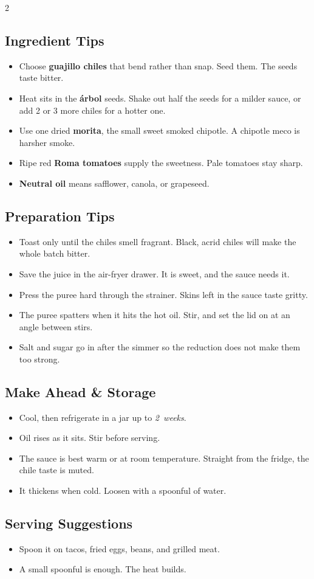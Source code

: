 \documentclass[11pt,letterpaper]{article}
\begin{document}
{\begin{multicols}{2}
\subsection*{Ingredient Tips}
\begin{itemize}
    \item Choose \textbf{guajillo chiles} that bend rather than snap. Seed them. The seeds taste bitter.
    \item Heat sits in the \textbf{árbol} seeds. Shake out half the seeds for a milder sauce, or add 2 or 3 more chiles for a hotter one.
    \item Use one dried \textbf{morita}, the small sweet smoked chipotle. A chipotle meco is harsher smoke.
    \item Ripe red \textbf{Roma tomatoes} supply the sweetness. Pale tomatoes stay sharp.
    \item \textbf{Neutral oil} means safflower, canola, or grapeseed.
\end{itemize}

\subsection*{Preparation Tips}
\begin{itemize}
    \item Toast only until the chiles smell fragrant. Black, acrid chiles will make the whole batch bitter.
    \item Save the juice in the air-fryer drawer. It is sweet, and the sauce needs it.
    \item Press the puree hard through the strainer. Skins left in the sauce taste gritty.
    \item The puree spatters when it hits the hot oil. Stir, and set the lid on at an angle between stirs.
    \item Salt and sugar go in after the simmer so the reduction does not make them too strong.
\end{itemize}

\subsection*{Make Ahead \& Storage}
\begin{itemize}
    \item Cool, then refrigerate in a jar up to \textit{2~weeks}.
    \item Oil rises as it sits. Stir before serving.
    \item The sauce is best warm or at room temperature. Straight from the fridge, the chile taste is muted.
    \item It thickens when cold. Loosen with a spoonful of water.
\end{itemize}

\subsection*{Serving Suggestions}
\begin{itemize}
    \item Spoon it on tacos, fried eggs, beans, and grilled meat.
    \item A small spoonful is enough. The heat builds.
\end{itemize}

\end{multicols}
}
\end{document}
